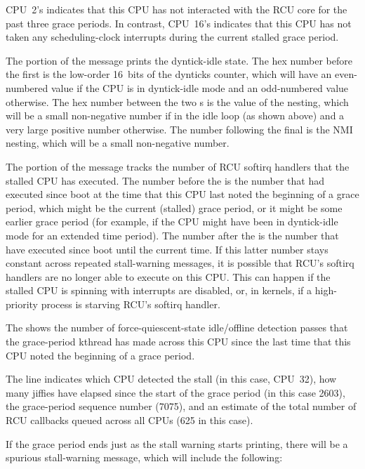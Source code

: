 CPU~2's  indicates that this CPU has not interacted with
the RCU core for the past three grace periods.
In contrast, CPU~16's 
indicates that this CPU has not taken any scheduling-clock
interrupts during the current stalled grace period.

The  portion of the message prints the dyntick-idle state.
The hex number before the first \qco{/} is the low-order 16~bits of the
dynticks counter, which will have an even-numbered value if the CPU
is in dyntick-idle mode and an odd-numbered value otherwise.
The hex
number between the two \qco{/}s is the value of the nesting, which will be
a small non-negative number if in the idle loop (as shown above) and a
very large positive number otherwise.
The number following the final
\qco{/} is the NMI nesting, which will be a small non-negative number.

The  portion of the message tracks the number of RCU softirq
handlers that the stalled CPU has executed.
The number before the \qco{/}
is the number that had executed since boot at the time that this CPU
last noted the beginning of a grace period, which might be the current
(stalled) grace period, or it might be some earlier grace period (for
example, if the CPU might have been in dyntick-idle mode for an extended
time period).
The number after the \qco{/} is the number that have executed
since boot until the current time.
If this latter number stays constant
across repeated stall-warning messages, it is possible that RCU's softirq
handlers are no longer able to execute on this CPU\@.
This can happen if
the stalled CPU is spinning with interrupts are disabled, or, in 
kernels, if a high-priority process is starving RCU's softirq handler.

The  shows the number of force-quiescent-state idle/offline
detection passes that the grace-period kthread has made across this
CPU since the last time that this CPU noted the beginning of a grace
period.

The  line indicates which CPU detected the stall (in this
case, CPU~32), how many jiffies have elapsed since the start of the grace
period (in this case 2603), the grace-period sequence number (7075), and
an estimate of the total number of RCU callbacks queued across all CPUs
(625 in this case).

If the grace period ends just as the stall warning starts printing,
there will be a spurious stall-warning message, which will include
the following:

